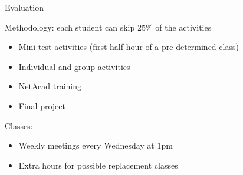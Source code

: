 
\begin{frame}{Evaluation}
    \begin{block}{Methodology: each student can skip 25\% of the activities}
        \begin{itemize}
            \item Mini-test activities (first half hour of a pre-determined class)
            \item Individual and group activities 
            \item NetAcad training
            \item Final project
        \end{itemize}
    \end{block}
    \begin{block}{Classes:}
        \begin{itemize}
            \item Weekly meetings every Wednesday at 1pm
            \item Extra hours for possible replacement classes 
        \end{itemize}
    \end{block}
\end{frame}